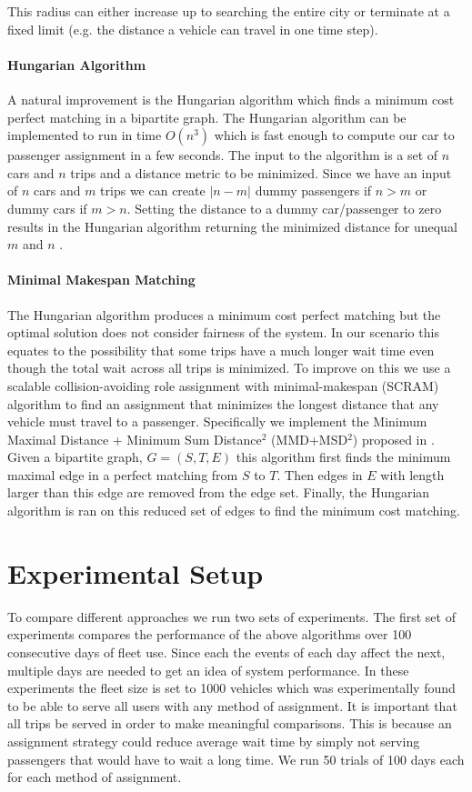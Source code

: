 \documentclass[letterpaper]{article}
\begin{document}
This radius can either increase up to searching the entire city or terminate at a fixed limit (e.g. the distance a vehicle can travel in one time step).

\paragraph{Hungarian Algorithm}
A natural improvement is the Hungarian algorithm \cite{kuhn1955hungarian} which finds a minimum cost perfect matching in a bipartite graph. The Hungarian algorithm can be implemented to run in time $O(n^3)$ which is fast enough to compute our car to passenger assignment in a few seconds. The input to the algorithm is a set of $n$ cars and $n$ trips and a distance metric to be minimized. Since we have an input of $n$ cars and $m$ trips we can create $|n-m|$ dummy passengers if $n > m$ or dummy cars if $m > n$. Setting the distance to a dummy car/passenger to zero results in the Hungarian algorithm returning the minimized distance for unequal $m$ and $n$ \cite{macalpine2015scram}.

\paragraph{Minimal Makespan Matching}
The Hungarian algorithm produces a minimum cost perfect matching but the optimal solution does not consider fairness of the system. In our scenario this equates to the possibility that some trips have a much longer wait time even though the total wait across all trips is minimized. To improve on this we use a scalable collision-avoiding role assignment with minimal-makespan (SCRAM) algorithm to find an assignment that minimizes the longest distance that any vehicle must travel to a passenger. Specifically we implement the Minimum Maximal Distance + Minimum Sum Distance$^2$ (MMD+MSD$^2$) proposed in \cite{macalpine2015scram}. Given a bipartite graph, $G = ({S,T},E)$  this algorithm first finds the minimum maximal edge in a perfect matching from $S$ to $T$. Then edges in $E$ with length larger than this edge are removed from the edge set. Finally, the Hungarian algorithm is ran on this reduced set of edges to find the minimum cost matching.  

\section{Experimental Setup}
To compare different approaches we run two sets of experiments. The first set of experiments compares the performance of the above algorithms over 100 consecutive days of fleet use. Since each the events of each day affect the next, multiple days are needed to get an idea of system performance. In these experiments the fleet size is set to 1000 vehicles which was experimentally found to be able to serve all users with any method of assignment. It is important that all trips be served in order to make meaningful comparisons. This is because an assignment strategy could reduce average wait time by simply not serving passengers that would have to wait a long time. We run 50 trials of 100 days each for each method of assignment.
\end{document}
